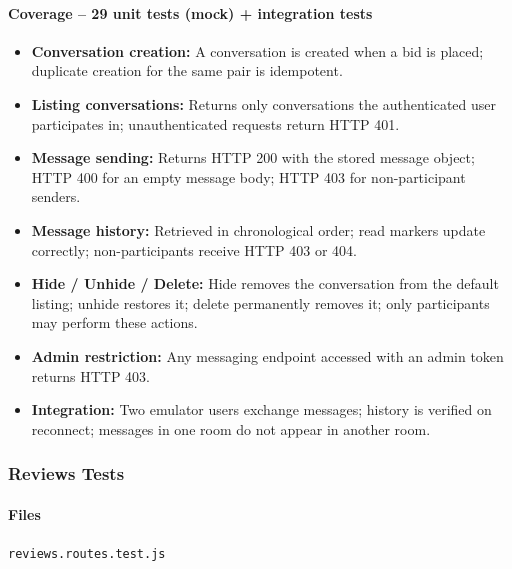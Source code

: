 \documentclass[11pt]{article}
\begin{document}
\paragraph{Coverage -- 29 unit tests (mock) + integration tests}
\begin{itemize}[leftmargin=1.4em]
  \item \textbf{Conversation creation:} A conversation is created when a bid is placed; duplicate creation for the same pair is idempotent.
  \item \textbf{Listing conversations:} Returns only conversations the authenticated user participates in; unauthenticated requests return HTTP 401.
  \item \textbf{Message sending:} Returns HTTP 200 with the stored message object; HTTP 400 for an empty message body; HTTP 403 for non-participant senders.
  \item \textbf{Message history:} Retrieved in chronological order; read markers update correctly; non-participants receive HTTP 403 or 404.
  \item \textbf{Hide / Unhide / Delete:} Hide removes the conversation from the default listing; unhide restores it; delete permanently removes it; only participants may perform these actions.
  \item \textbf{Admin restriction:} Any messaging endpoint accessed with an admin token returns HTTP 403.
  \item \textbf{Integration:} Two emulator users exchange messages; history is verified on reconnect; messages in one room do not appear in another room.
\end{itemize}

\subsubsection{Reviews Tests}

\paragraph{Files}
\texttt{reviews.routes.test.js}
\end{document}
